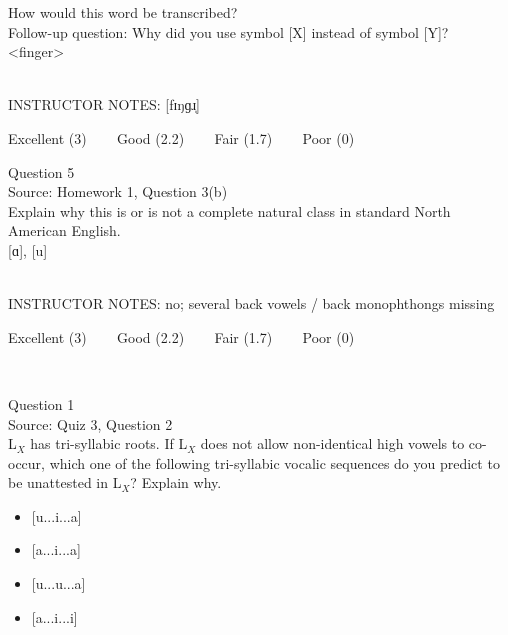 \documentclass[12pt]{article}
\begin{document}
How would this word be transcribed?\\ Follow-up question: Why did you use symbol [X] instead of symbol [Y]?\\

<finger>


~\\
INSTRUCTOR NOTES: [fɪŋɡɹ̩]


\vfill
Excellent (3) ~~~ Good (2.2) ~~~ Fair (1.7) ~~~ Poor (0)
\newpage

{\large Question 5}\\

Source: Homework 1, Question 3(b)\\

Explain why this is or is not a complete natural class in standard North American English.\\

{[ɑ]}, {[u]}


~\\
INSTRUCTOR NOTES: no; several back vowels / back monophthongs missing


\vfill
Excellent (3) ~~~ Good (2.2) ~~~ Fair (1.7) ~~~ Poor (0)
\newpage

\begin{center}
\textbf{{\color{red}{\HUGE END OF EXAM}}}\\

\end{center}
\newpage

\begin{center}
\textbf{{\color{blue}{\HUGE START OF EXAM\\}}}

\textbf{{\color{blue}{\HUGE Student ID: 1887\\}}}

\textbf{{\color{blue}{\HUGE 5:15 - 5:30 PM\\}}}

\end{center}
\newpage

{\large Question 1}\\

Source: Quiz 3, Question 2\\

L$_X$ has tri-syllabic roots. If L$_X$ does not allow non-identical high vowels to co-occur, which one of the following tri-syllabic vocalic sequences do you predict to be unattested in L$_X$? Explain why.\\

\begin{itemize} \item {[u...i...a]} \item {[a...i...a]} \item {[u...u...a]} \item {[a...i...i]} \end{itemize}
\end{document}
